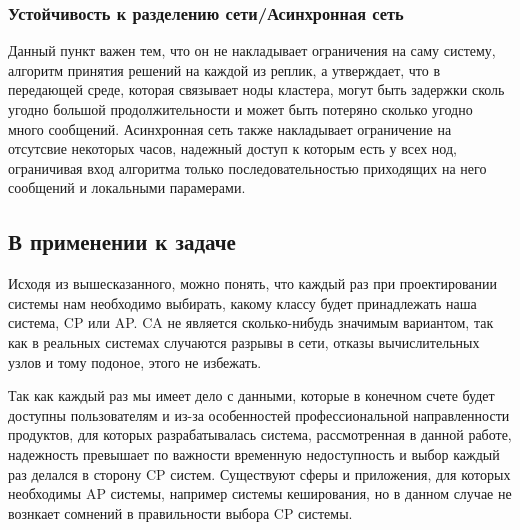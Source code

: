 \subsubsection{Устойчивость к разделению сети/Асинхронная сеть}

Данный пункт важен тем, что он не накладывает ограничения на саму систему, алгоритм принятия решений на каждой из реплик, а утверждает, что в передающей среде, которая связывает ноды кластера, могут быть задержки сколь угодно большой продолжительности и может быть потеряно сколько угодно много сообщений. Асинхронная сеть также накладывает ограничение на отсутсвие некоторых часов, надежный доступ к которым есть у всех нод, ограничивая вход алгоритма только последовательностью приходящих на него сообщений и локальными парамерами.

\subsection{В применении к задаче}

Исходя из вышесказанного, можно понять, что каждый раз при проектировании системы нам необходимо выбирать, какому классу будет принадлежать наша система, CP или AP. CA не является сколько-нибудь значимым вариантом, так как в реальных системах случаются разрывы в сети, отказы вычислительных узлов и тому подоное, этого не избежать.

Так как каждый раз мы имеет дело с данными, которые в конечном счете будет доступны пользователям и из-за особенностей профессиональной направленности продуктов, для которых разрабатывалась система, рассмотренная в данной работе, надежность превышает по важности временную недоступность и выбор каждый раз делался в сторону CP систем. Существуют сферы и приложения, для которых необходимы AP системы, например системы кеширования, но в данном случае не вознкает сомнений в правильности выбора CP системы.

\clearpage
